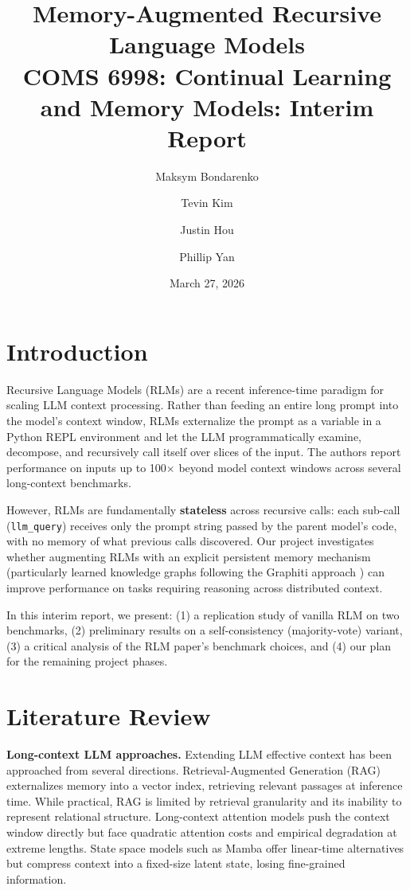 \documentclass[11pt]{article}
\title{Memory-Augmented Recursive Language Models\\
\large COMS 6998: Continual Learning and Memory Models: Interim Report}
\author{Maksym Bondarenko \and Tevin Kim \and Justin Hou \and Phillip Yan}
\date{March 27, 2026}
\begin{document}
\maketitle

\section{Introduction}

Recursive Language Models (RLMs) \citep{zhang2026rlm} are a recent inference-time paradigm for scaling LLM context processing. Rather than feeding an entire long prompt into the model's context window, RLMs externalize the prompt as a variable in a Python REPL environment and let the LLM programmatically examine, decompose, and recursively call itself over slices of the input. The authors report performance on inputs up to 100$\times$ beyond model context windows across several long-context benchmarks.

However, RLMs are fundamentally \textbf{stateless} across recursive calls: each sub-call (\texttt{llm\_query}) receives only the prompt string passed by the parent model's code, with no memory of what previous calls discovered. Our project investigates whether augmenting RLMs with an explicit persistent memory mechanism (particularly learned knowledge graphs following the Graphiti approach \citep{ranade2025graphiti}) can improve performance on tasks requiring reasoning across distributed context.

In this interim report, we present: (1) a replication study of vanilla RLM on two benchmarks, (2) preliminary results on a self-consistency (majority-vote) variant, (3) a critical analysis of the RLM paper's benchmark choices, and (4) our plan for the remaining project phases.

\section{Literature Review}

\textbf{Long-context LLM approaches.} Extending LLM effective context has been approached from several directions. Retrieval-Augmented Generation (RAG) \citep{lewis2020rag} externalizes memory into a vector index, retrieving relevant passages at inference time. While practical, RAG is limited by retrieval granularity and its inability to represent relational structure. Long-context attention models \citep{press2022alibi} push the context window directly but face quadratic attention costs and empirical degradation at extreme lengths. State space models such as Mamba \citep{gu2023mamba} offer linear-time alternatives but compress context into a fixed-size latent state, losing fine-grained information.
\end{document}
